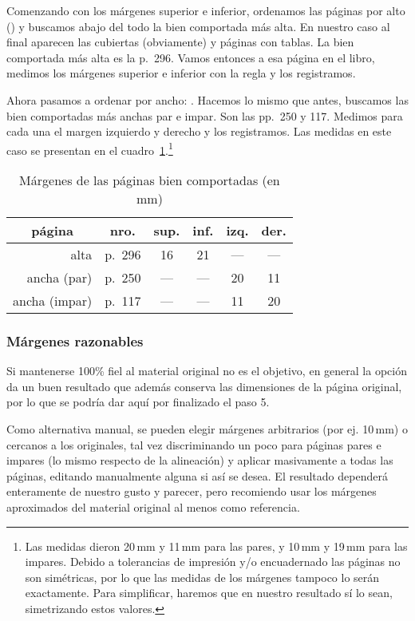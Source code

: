 \documentclass[%
	a5paper,
	10pt,
	twoside,
	openright,
	final,
]{memoir}
\begin{document}
{	Comenzando con los márgenes superior e inferior, ordenamos las páginas por alto () y buscamos abajo del todo la bien comportada más alta. En nuestro caso al final aparecen las cubiertas (obviamente) y páginas con tablas. La bien comportada más alta es la p.~296. Vamos entonces a esa página en el libro, medimos los márgenes superior e inferior con la regla y los registramos.

	Ahora pasamos a ordenar por ancho: . Hacemos lo mismo que antes, buscamos las bien comportadas más anchas par e impar. Son las pp.~250 y 117. Medimos para cada una el margen izquierdo y derecho y los registramos. Las medidas en este caso se presentan en el cuadro~\ref{tab:pageMargins}.\footnote{Las medidas dieron 20\,mm y 11\,mm para las pares, y 10\,mm y 19\,mm para las impares. Debido a tolerancias de impresión y/o encuadernado las páginas no son simétricas, por lo que las medidas de los márgenes tampoco lo serán exactamente. Para simplificar, haremos que en nuestro resultado sí lo sean, simetrizando estos valores.}

	\begin{table}
		\centering
		\begin{tabular}{@{}rlcccc@{}}
			\toprule
			\multicolumn{1}{c}{página} & \multicolumn{1}{c}{nro.} & sup. & inf. & izq. & der. \\
			\midrule
			alta & p.~296 & 16 & 21 & --- & --- \\
			ancha (par) & p.~250 & --- & --- & 20 & 11 \\
			ancha (impar) & p.~117 & --- & --- & 11 & 20 \\
			\bottomrule
		\end{tabular}
		\caption{Márgenes de las páginas bien comportadas (en mm)\label{tab:pageMargins}}
	\end{table}

	\subsubsection{Márgenes razonables\label{sec:STmarginsReasonables}} Si mantenerse 100\% fiel al material original no es el objetivo, en general la opción  da un buen resultado que además conserva las dimensiones de la página original, por lo que se podría dar aquí por finalizado el paso 5.

	Como alternativa manual, se pueden elegir márgenes arbitrarios (por ej. 10\,mm) o cercanos a los originales, tal vez discriminando un poco para páginas pares e impares (lo mismo respecto de la alineación) y aplicar masivamente a todas las páginas, editando manualmente alguna si así se desea. El resultado dependerá enteramente de nuestro gusto y parecer, pero recomiendo usar los márgenes aproximados del material original al menos como referencia.

}
\end{document}
